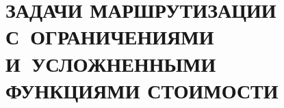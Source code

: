 
\chapter{
  ЗАДАЧИ МАРШРУТИЗАЦИИ С~ОГРАНИЧЕНИЯМИ И~УСЛОЖНЕННЫМИ
  ФУНКЦИЯМИ СТОИМОСТИ
}
\setcounter{chapter}{4}
\setcounter{equation}{0}









